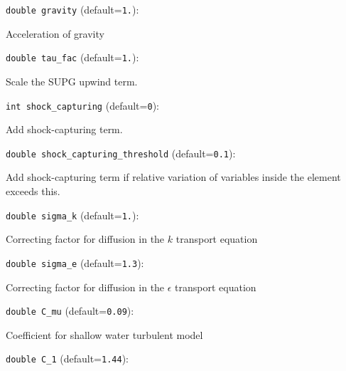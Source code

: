 \item\verb+double gravity+ {\rm(default=\verb|1.|)}:

Acceleration of gravity

\item\verb+double tau_fac+ {\rm(default=\verb|1.|)}:

Scale the SUPG upwind term. 

\item\verb+int shock_capturing+ {\rm(default=\verb|0|)}:

Add shock-capturing term.

\item\verb+double shock_capturing_threshold+ {\rm(default=\verb|0.1|)}:

Add shock-capturing term if relative variation of variables
inside the element exceeds this.

\item\verb+double sigma_k+ {\rm(default=\verb|1.|)}:

Correcting factor for diffusion in the $k$ transport equation

\item\verb+double sigma_e+ {\rm(default=\verb|1.3|)}:

Correcting factor for diffusion in the $\epsilon$ transport equation

\item\verb+double C_mu+ {\rm(default=\verb|0.09|)}:

Coefficient for shallow water turbulent model

\item\verb+double C_1+ {\rm(default=\verb|1.44|)}:

